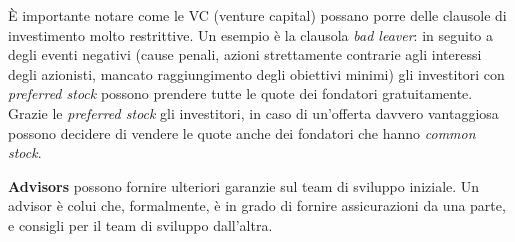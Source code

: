 È importante notare come le VC (venture capital) possano porre delle clausole
di investimento molto restrittive. Un esempio è la clausola
\textit{bad leaver}: in seguito a degli eventi negativi (cause penali, azioni
strettamente contrarie agli interessi degli azionisti, mancato raggiungimento
degli obiettivi minimi) gli investitori con \textit{preferred stock} possono
prendere tutte le quote dei fondatori gratuitamente. Grazie le
\textit{preferred stock} gli investitori, in caso di un'offerta davvero
vantaggiosa possono decidere di vendere le quote anche dei fondatori che
hanno \textit{common stock}.

\textbf{Advisors} possono fornire ulteriori garanzie sul team di sviluppo
iniziale. Un advisor è colui che, formalmente, è in grado di fornire
assicurazioni da una parte, e consigli per il team di sviluppo dall'altra.
